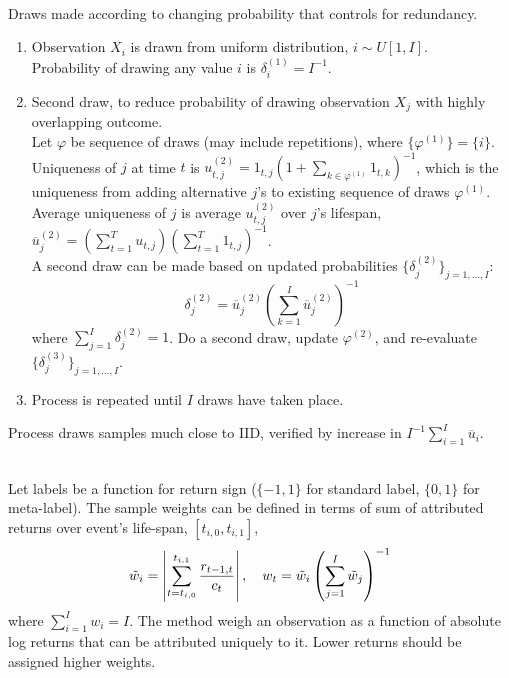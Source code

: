 \begin{method} \\
Draws made according to changing probability that controls for redundancy.
\begin{enumerate}[label=\roman*.]
\setlength{\itemsep}{0pt}
\item Observation $X_i$ is drawn from uniform distribution, $i \sim U[1, I]$.\\
Probability of drawing any value $i$ is $\delta^{(1)}_i = I^{-1}$.
\item Second draw, to reduce probability of drawing observation $X_j$ with highly overlapping outcome.\\
Let $\varphi$ be sequence of draws (may include repetitions), where $\{\varphi^{(1)}\} = \{i\}$.\\
Uniqueness of $j$ at time $t$ is $u^{(2)}_{t,j} = 1_{t,j} (1 + \sum_{k \in \varphi^{(1)}} 1_{t,k})^{-1}$, which is the uniqueness from adding alternative $j$'s to existing sequence of draws $\varphi^{(1)}$.\\
Average uniqueness of $j$ is average $u^{(2)}_{t,j}$ over $j$'s lifespan, $\overline{u}^{(2)}_j = (\sum_{t=1}^T u_{t,j}) (\sum_{t=1}^T 1_{t,j})^{-1}$.\\
A second draw can be made based on updated probabilities $\{\delta^{(2)}_j\}_{j = 1, \ldots, I}$:
\begin{equation}
\delta^{(2)}_j = \overline{u}^{(2)}_j \left( \sum\limits_{k=1}^I \overline{u}^{(2)}_j \right)^{-1} \nonumber
\end{equation}
where $\sum_{j=1}^I \delta^{(2)}_j = 1$.
Do a second draw, update $\varphi^{(2)}$, and re-evaluate $\{\delta^{(3)}_j \}_{j=1, \ldots, I}$.
\item Process is repeated until $I$ draws have taken place.
\end{enumerate}
Process draws samples much close to IID, verified by increase in $I^{-1} \sum_{i=1}^I \overline{u}_i$.
\end{method}

\begin{method} \\
Let labels be a function for return sign ($\{-1, 1\}$ for standard label, $\{0, 1\}$ for meta-label). The sample weights can be defined in terms of sum of attributed returns over event's life-span, $[t_{i,0}, t_{i,1}]$,
\begin{equation}
\tilde{w}_{i} = \left\lvert\sum\limits_{t = t_{i,0}}^{t_{i,1}} \frac{r_{t-1, t}}{c_t}\right\rvert, \ \ \ w_t = \tilde{w}_{i} \left( \sum\limits_{j=1}^I \tilde{w}_j \right)^{-1} \nonumber
\end{equation}
where $\sum_{i=1}^I w_i = I$. The method weigh an observation as a function of absolute log returns that can be attributed uniquely to it. Lower returns should be assigned higher weights.
\end{method}

